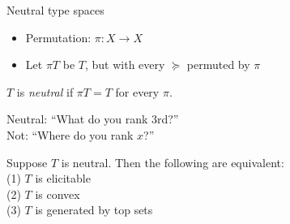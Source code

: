 \begin{frame}{Neutral type spaces}{}

\begin{itemize}
\item Permutation: $\pi:X\to X$

\medskip

\item Let $\pi T$ be $T$, but with every $\succeq$ permuted by $\pi$
\end{itemize}

\bigskip

\begin{definition}
$T$ is \emph{neutral} if $\pi T =T$ for every $\pi$.
\end{definition}

Neutral: ``What do you rank 3rd?''\\
Not: ``Where do you rank $x$?''

\pause

\medskip

\begin{proposition}
Suppose $T$ is neutral. Then the following are equivalent:\\
(1) $T$ is elicitable\\
(2) $T$ is convex\\
(3) $T$ is generated by top sets
\end{proposition}

\end{frame}
%
%
%
%
%
%
%
%
%
%


